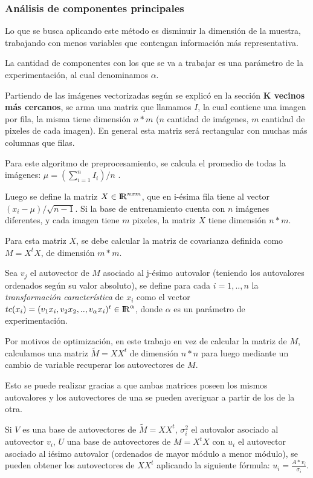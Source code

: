 \subsubsection*{An\'alisis de componentes principales}
Lo que se busca aplicando este método es disminuir la dimensión de la muestra, trabajando con menos variables que contengan información más representativa.
\par La cantidad de componentes con los que se va a trabajar es una parámetro de la experimentación, al cual denominamos $\alpha$.
\par Partiendo de las imágenes vectorizadas según se explicó en la sección \textbf{ K vecinos m\'as cercanos}, se arma una matriz que llamamos $I$, la cual contiene una imagen por fila, la misma tiene dimensión $n*m$ ($n$ cantidad de imágenes, $m$ cantidad de pixeles de cada imagen). En general esta matriz será rectangular con muchas más columnas que filas.
\par Para este algoritmo de preprocesamiento, se calcula el promedio de todas la im\'agenes: $\mu = (\sum_{i=1}^{n}I_{i})/n$ .
\par Luego se define la matriz $X \in {\rm I\!R}^{nxm}$, que en i-\'esima fila tiene al vector $(x_i -  \mu)/\sqrt{n -1}$. Si la base de entrenamiento cuenta con $n$ imágenes diferentes, y cada imagen tiene $m$ pixeles, la matriz $X$ tiene dimensión $n*m$.
\par Para esta matriz $X$, se debe calcular la matriz de covarianza definida como $M = X^tX$, de dimensión $m*m$.
\par Sea $v_j$ el autovector de $M$ asociado al j-\'esimo autovalor (teniendo los autovalores ordenados seg\'un su valor absoluto), se define para cada
$i = 1,..,n$ la \textit{transformaci\'on caracter\'istica} de $x_i$ como el vector $tc(x_i) = (v_1x_i,v_2x_2,..,v_\alpha x_i)^t \in {\rm I\!R}^\alpha$,
donde $\alpha$ es un par\'ametro de experimentaci\'on.\\
\par Por motivos de optimización, en este trabajo en vez de calcular la matriz de $M$, calculamos una matriz $\tilde{M} = XX^t$ de dimensión $n*n$ para luego mediante un cambio de variable
recuperar los autovectores de $M$.
\par Esto se puede realizar gracias a que ambas matrices poseen los mismos autovalores y los autovectores de una se pueden averiguar a partir de los de la otra.
\par Si $V$ es una base de autovectores de $\tilde{M} = XX^t$, $\sigma^2_{i}$ el autovalor asociado al autovector $v_i$, $U$ una base de autovectores de $M = X^tX$ con $u_i$ el autovector asociado al i\-ésimo autovalor (ordenados de mayor módulo a menor módulo), se pueden obtener los autovectores de $XX^t$ aplicando la siguiente fórmula: $u_i = \frac{A*v_i}{\sigma_i}$.

